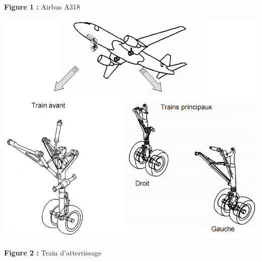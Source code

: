 \documentclass[10pt,fleqn]{article} %
\begin{document}
\begin{multicols}{2}
\begin{center}
\textbf{Figure 1 :} Airbus A318
\end{center}
\begin{center}
\includegraphics[width=.95\linewidth]{images/image2.png}

\textbf{Figure 2 :} Train d'atterrissage
\end{center}


\end{multicols}
\end{document}
